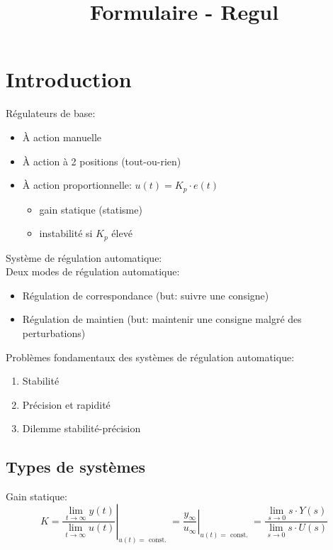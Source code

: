 \documentclass[10pt, twocolumn]{article}
\title{Formulaire - Regul}
\begin{document}
	\maketitle
	
	\section{Introduction}
		
		Régulateurs de base:
		
		\begin{itemize}
			\item À action manuelle
			\item À action à 2 positions (tout-ou-rien)
			\item À action proportionnelle: $u(t) = K_p \cdot e(t)$
				\begin{itemize}
					\item gain statique (statisme)
					\item instabilité si $K_p$ élevé
				\end{itemize}
		\end{itemize}
		
		Système de régulation automatique:\\
		
		
		Deux modes de régulation automatique:
		
		\begin{itemize}
			\item Régulation de correspondance (but: suivre une consigne)
			\item Régulation de maintien (but: maintenir une consigne malgré des perturbations)
		\end{itemize}
		
		Problèmes fondamentaux des systèmes de régulation automatique:
		
		\begin{enumerate}
			\item Stabilité
			\item Précision et rapidité
			\item Dilemme stabilité-précision
		\end{enumerate}
		
		\subsection*{Types de systèmes}
		
			Gain statique:
			\[K=\left.\frac{\lim _{t \rightarrow \infty} y(t)}{\lim _{t \rightarrow \infty} u(t)}\right|_{u(t)=\text { const. }}=\left.\frac{y_{\infty}}{u_{\infty}}\right|_{u(t)=\text { const. }} = \frac{\lim _{s \rightarrow 0} s \cdot Y(s)}{\lim _{s \rightarrow 0} s \cdot U(s)}\]
			
\end{document}
